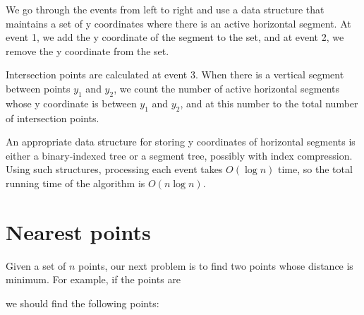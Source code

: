 We go through the events from left to right
and use a data structure that maintains a set of
y coordinates where there is an active horizontal segment.
At event 1, we add the y coordinate of the segment
to the set, and at event 2, we remove the
y coordinate from the set.

Intersection points are calculated at event 3.
When there is a vertical segment between points
$y_1$ and $y_2$, we count the number of active
horizontal segments whose y coordinate is between
$y_1$ and $y_2$, and at this number to the total
number of intersection points.

An appropriate data structure for storing
y coordinates of horizontal segments is either
a binary-indexed tree or a segment tree,
possibly with index compression.
Using such structures, processing each event
takes $O(\log n)$ time, so the total running
time of the algorithm is $O(n \log n)$.

\section{Nearest points}


Given a set of $n$ points, our next problem is
to find two points whose distance is minimum.
For example, if the points are
\begin{center}
\end{center}
\begin{samepage}
we should find the following points:
\begin{center}
\end{center}
\end{samepage}

